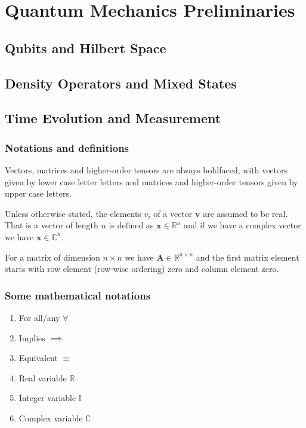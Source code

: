 \chapter{Quantum Mechanics Preliminaries}
\section{Qubits and Hilbert Space}
\section{Density Operators and Mixed States}
\section{Time Evolution and Measurement}




\subsection{Notations and definitions}

Vectors, matrices and higher-order tensors are always boldfaced, with vectors
given by lower case letter letters and matrices and higher-order tensors given by upper case letters.

Unless otherwise stated, the elements $v_i$ of a vector $\bm{v}$ are assumed to be real. That is a vector of length $n$ is defined as
$\bm{x}\in \mathbb{R}^{n}$ and if we have a complex vector we have $\bm{x}\in \mathbb{C}^{n}$.

For a matrix of dimension $n\times n$ we have 
$\bm{A}\in \mathbb{R}^{n\times n}$ and the first matrix element starts with row element (row-wise ordering) zero and column element zero.

\subsection{Some  mathematical notations}
\begin{enumerate}
\item For all/any  $\forall$

\item Implies $\implies$

\item Equivalent $\equiv$

\item Real variable $\mathbb{R}$

\item Integer variable $\mathbb{I}$

\item Complex  variable $\mathbb{C}$
\end{enumerate}

